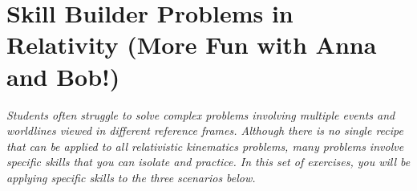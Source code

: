 \section{Skill Builder Problems in Relativity (More Fun with Anna and Bob!)}



\bigskip

\textit{Students often struggle to solve complex problems involving multiple events and worldlines viewed in different reference frames.  Although there is no single recipe that can be applied to all relativistic kinematics problems, many problems involve specific skills that you can isolate and practice.  
In this set of exercises, you will be applying specific skills to the three scenarios below.
}
\bigskip
